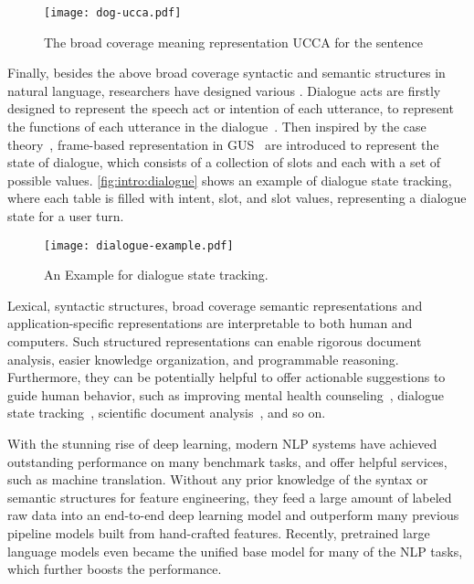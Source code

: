 \begin{figure}[!th]
\centering
\texttt{[image: dog-ucca.pdf]}
\caption{\label{fig:intro:dog-ucca} The broad coverage meaning
  representation UCCA for the sentence \emph{}}
\end{figure}

Finally, besides the above broad coverage syntactic and semantic
structures in natural language, researchers have designed various
. Dialogue acts are
firstly designed to represent the speech act or intention of each
utterance, to represent the functions of each utterance in the
dialogue~\citep{wittgenstein2010philosophical,bunt2010towards}. Then
inspired by the case theory~\citep{Fillmore:68}, frame-based
representation in GUS~\citep{bobrow1977gus} are introduced to
represent the state of dialogue, which consists of a collection of
slots and each with a set of possible
values. \autoref{fig:intro:dialogue} shows an example of dialogue
state tracking, where each table is filled with intent, slot, and slot
values, representing a dialogue state for a user turn.

\begin{figure}[!th]
\centering
\texttt{[image: dialogue-example.pdf]}
\caption{\label{fig:intro:dialogue} An Example for dialogue state
  tracking.}
\end{figure}

Lexical, syntactic structures, broad coverage semantic representations
and application-specific representations are interpretable to both
human and computers. Such structured representations can enable
rigorous document analysis, easier knowledge organization, and
programmable reasoning. Furthermore, they can be potentially helpful
to offer actionable suggestions to guide human behavior, such as
improving mental health counseling~\citep{tanana2016comparison},
dialogue state tracking~\citep{budzianowski2018multiwoz}, scientific
document analysis~\citep{dernoncourt2017pubmed}, and so on.

With the stunning rise of deep learning, modern NLP systems have
achieved outstanding performance on many benchmark tasks, and offer
helpful services, such as machine translation. Without any prior
knowledge of the syntax or semantic structures for feature
engineering, they feed a large amount of labeled raw data
into an end-to-end deep learning model and outperform many previous
pipeline models built from hand-crafted features. Recently, pretrained
large language models even became the unified base model for many of
the NLP tasks, which further boosts the performance.

